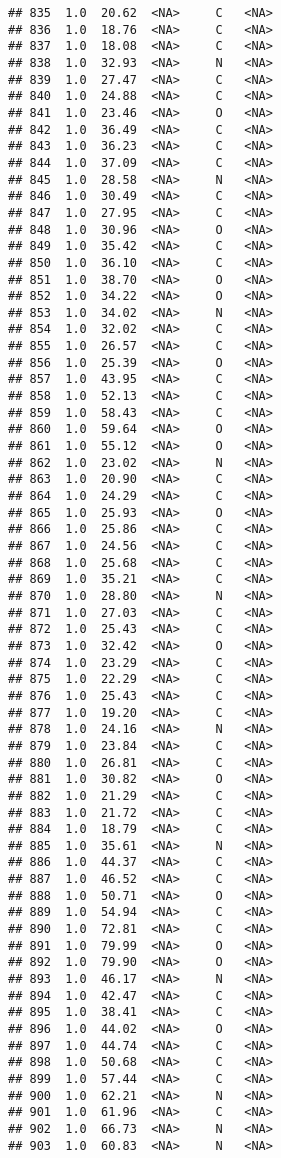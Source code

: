 \documentclass[
]{article}
\begin{document}
\begin{verbatim}
## 835  1.0  20.62  <NA>     C   <NA>
## 836  1.0  18.76  <NA>     C   <NA>
## 837  1.0  18.08  <NA>     C   <NA>
## 838  1.0  32.93  <NA>     N   <NA>
## 839  1.0  27.47  <NA>     C   <NA>
## 840  1.0  24.88  <NA>     C   <NA>
## 841  1.0  23.46  <NA>     O   <NA>
## 842  1.0  36.49  <NA>     C   <NA>
## 843  1.0  36.23  <NA>     C   <NA>
## 844  1.0  37.09  <NA>     C   <NA>
## 845  1.0  28.58  <NA>     N   <NA>
## 846  1.0  30.49  <NA>     C   <NA>
## 847  1.0  27.95  <NA>     C   <NA>
## 848  1.0  30.96  <NA>     O   <NA>
## 849  1.0  35.42  <NA>     C   <NA>
## 850  1.0  36.10  <NA>     C   <NA>
## 851  1.0  38.70  <NA>     O   <NA>
## 852  1.0  34.22  <NA>     O   <NA>
## 853  1.0  34.02  <NA>     N   <NA>
## 854  1.0  32.02  <NA>     C   <NA>
## 855  1.0  26.57  <NA>     C   <NA>
## 856  1.0  25.39  <NA>     O   <NA>
## 857  1.0  43.95  <NA>     C   <NA>
## 858  1.0  52.13  <NA>     C   <NA>
## 859  1.0  58.43  <NA>     C   <NA>
## 860  1.0  59.64  <NA>     O   <NA>
## 861  1.0  55.12  <NA>     O   <NA>
## 862  1.0  23.02  <NA>     N   <NA>
## 863  1.0  20.90  <NA>     C   <NA>
## 864  1.0  24.29  <NA>     C   <NA>
## 865  1.0  25.93  <NA>     O   <NA>
## 866  1.0  25.86  <NA>     C   <NA>
## 867  1.0  24.56  <NA>     C   <NA>
## 868  1.0  25.68  <NA>     C   <NA>
## 869  1.0  35.21  <NA>     C   <NA>
## 870  1.0  28.80  <NA>     N   <NA>
## 871  1.0  27.03  <NA>     C   <NA>
## 872  1.0  25.43  <NA>     C   <NA>
## 873  1.0  32.42  <NA>     O   <NA>
## 874  1.0  23.29  <NA>     C   <NA>
## 875  1.0  22.29  <NA>     C   <NA>
## 876  1.0  25.43  <NA>     C   <NA>
## 877  1.0  19.20  <NA>     C   <NA>
## 878  1.0  24.16  <NA>     N   <NA>
## 879  1.0  23.84  <NA>     C   <NA>
## 880  1.0  26.81  <NA>     C   <NA>
## 881  1.0  30.82  <NA>     O   <NA>
## 882  1.0  21.29  <NA>     C   <NA>
## 883  1.0  21.72  <NA>     C   <NA>
## 884  1.0  18.79  <NA>     C   <NA>
## 885  1.0  35.61  <NA>     N   <NA>
## 886  1.0  44.37  <NA>     C   <NA>
## 887  1.0  46.52  <NA>     C   <NA>
## 888  1.0  50.71  <NA>     O   <NA>
## 889  1.0  54.94  <NA>     C   <NA>
## 890  1.0  72.81  <NA>     C   <NA>
## 891  1.0  79.99  <NA>     O   <NA>
## 892  1.0  79.90  <NA>     O   <NA>
## 893  1.0  46.17  <NA>     N   <NA>
## 894  1.0  42.47  <NA>     C   <NA>
## 895  1.0  38.41  <NA>     C   <NA>
## 896  1.0  44.02  <NA>     O   <NA>
## 897  1.0  44.74  <NA>     C   <NA>
## 898  1.0  50.68  <NA>     C   <NA>
## 899  1.0  57.44  <NA>     C   <NA>
## 900  1.0  62.21  <NA>     N   <NA>
## 901  1.0  61.96  <NA>     C   <NA>
## 902  1.0  66.73  <NA>     N   <NA>
## 903  1.0  60.83  <NA>     N   <NA>

\end{verbatim}
\end{document}
